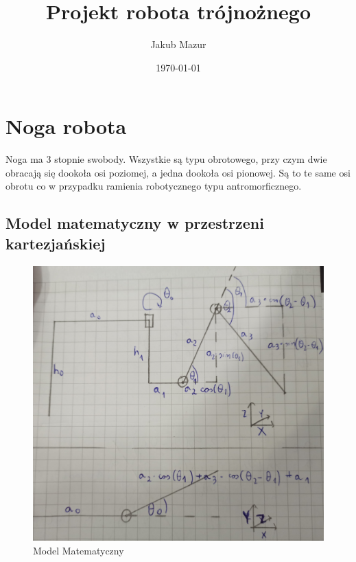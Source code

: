 \documentclass[a4paper,13pt]{article}
\title{Projekt robota trójnożnego}
\author{Jakub Mazur}
\date{\today}
\begin{document}


\maketitle

\hypersetup{
	linktocpage=true,
    colorlinks=true,
    urlcolor=red,
    linktoc=all,
    linkcolor=blue,
}
\tableofcontents

\section{Noga robota}
Noga ma 3 stopnie swobody. Wszystkie są typu obrotowego, przy czym dwie obracają się dookoła osi poziomej, a jedna dookoła osi pionowej. Są to te same osi obrotu co w przypadku ramienia robotycznego typu antromorficznego.
\subsection{Model matematyczny w przestrzeni kartezjańskiej}

\begin{figure}[H]
\includegraphics[width=\textwidth]{img/math_model.jpg}
\caption{Model Matematyczny}
\label{math_model}
\end{figure}
\end{document}
